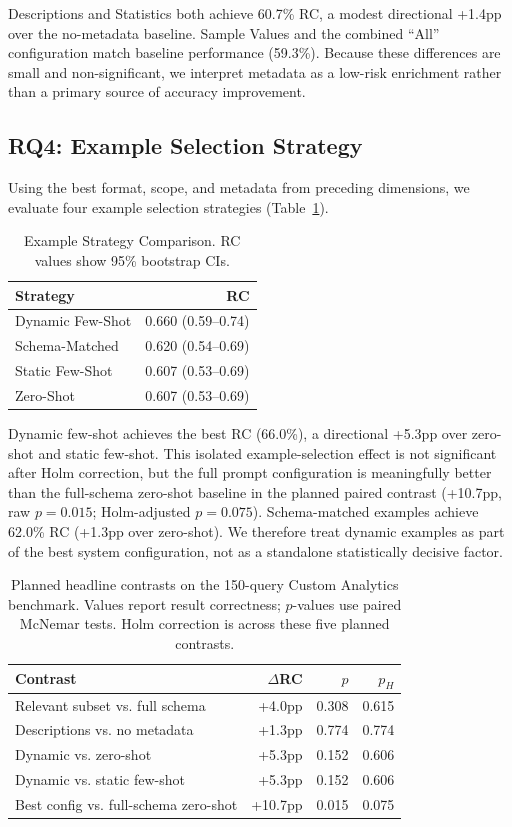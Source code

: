 \documentclass[sigconf, nonacm]{acmart}
\begin{document}
Descriptions and Statistics both achieve 60.7\% RC, a modest directional +1.4pp over the no-metadata baseline. Sample Values and the combined ``All'' configuration match baseline performance (59.3\%). Because these differences are small and non-significant, we interpret metadata as a low-risk enrichment rather than a primary source of accuracy improvement.

\subsection{RQ4: Example Selection Strategy}

Using the best format, scope, and metadata from preceding dimensions, we evaluate four example selection strategies (Table~\ref{tab:examples}).

\begin{table}[t]
\caption{Example Strategy Comparison. RC values show 95\% bootstrap CIs.}
\label{tab:examples}
\centering
\small
\begin{tabular}{lr}
\toprule
\textbf{Strategy} & \textbf{RC} \\
\midrule
Dynamic Few-Shot & 0.660 (0.59--0.74) \\
Schema-Matched & 0.620 (0.54--0.69) \\
Static Few-Shot & 0.607 (0.53--0.69) \\
Zero-Shot & 0.607 (0.53--0.69) \\
\bottomrule
\end{tabular}
\end{table}

Dynamic few-shot achieves the best RC (66.0\%), a directional +5.3pp over zero-shot and static few-shot. This isolated example-selection effect is not significant after Holm correction, but the full prompt configuration is meaningfully better than the full-schema zero-shot baseline in the planned paired contrast (+10.7pp, raw $p{=}0.015$; Holm-adjusted $p{=}0.075$). Schema-matched examples achieve 62.0\% RC (+1.3pp over zero-shot). We therefore treat dynamic examples as part of the best system configuration, not as a standalone statistically decisive factor.

\begin{table}[t]
\caption{Planned headline contrasts on the 150-query Custom Analytics benchmark. Values report result correctness; $p$-values use paired McNemar tests. Holm correction is across these five planned contrasts.}
\label{tab:headline-contrasts}
\centering
\footnotesize
\begin{tabular}{lrrr}
\toprule
\textbf{Contrast} & \textbf{$\Delta$RC} & \textbf{$p$} & \textbf{$p_H$} \\
\midrule
Relevant subset vs. full schema & +4.0pp & 0.308 & 0.615 \\
Descriptions vs. no metadata & +1.3pp & 0.774 & 0.774 \\
Dynamic vs. zero-shot & +5.3pp & 0.152 & 0.606 \\
Dynamic vs. static few-shot & +5.3pp & 0.152 & 0.606 \\
Best config vs. full-schema zero-shot & +10.7pp & 0.015 & 0.075 \\
\bottomrule
\end{tabular}
\end{table}
\end{document}
